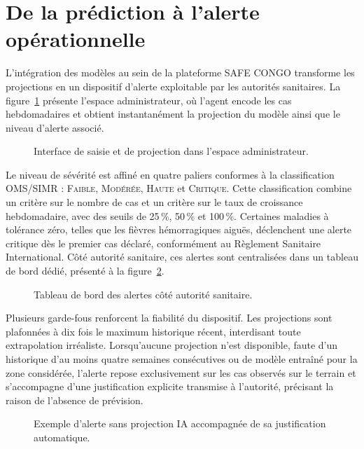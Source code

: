 \section{De la prédiction à l'alerte opérationnelle}

L'intégration des modèles au sein de la plateforme \textsc{SAFE CONGO} transforme
les projections en un dispositif d'alerte exploitable par les autorités sanitaires.
La figure~\ref{fig:app-saisie} présente l'espace administrateur, où l'agent encode
les cas hebdomadaires et obtient instantanément la projection du modèle ainsi que le
niveau d'alerte associé.

\begin{figure}[htbp]
  \centering
  \caption{Interface de saisie et de projection dans l'espace administrateur.}
  \label{fig:app-saisie}
\end{figure}

Le niveau de sévérité est affiné en quatre paliers conformes à la classification
OMS/SIMR : \textsc{Faible}, \textsc{Modérée}, \textsc{Haute} et \textsc{Critique}.
Cette classification combine un critère sur le nombre de cas et un critère sur le
taux de croissance hebdomadaire, avec des seuils de 25\,\%, 50\,\% et 100\,\%.
Certaines maladies à tolérance zéro, telles que les fièvres hémorragiques aiguës,
déclenchent une alerte critique dès le premier cas déclaré, conformément au
Règlement Sanitaire International. Côté autorité sanitaire, ces alertes sont
centralisées dans un tableau de bord dédié, présenté à la figure~\ref{fig:app-alertes}.

\begin{figure}[htbp]
  \centering
  \caption{Tableau de bord des alertes côté autorité sanitaire.}
  \label{fig:app-alertes}
\end{figure}

Plusieurs garde-fous renforcent la fiabilité du dispositif. Les projections sont
plafonnées à dix fois le maximum historique récent, interdisant toute extrapolation
irréaliste. Lorsqu'aucune projection n'est disponible, faute d'un historique d'au
moins quatre semaines consécutives ou de modèle entraîné pour la zone considérée,
l'alerte repose exclusivement sur les cas observés sur le terrain et s'accompagne
d'une justification explicite transmise à l'autorité, précisant la raison de
l'absence de prévision.

\begin{figure}[htbp]
  \centering
  \caption{Exemple d'alerte sans projection IA accompagnée de sa justification automatique.}
  \label{fig:app-justification}
\end{figure}

